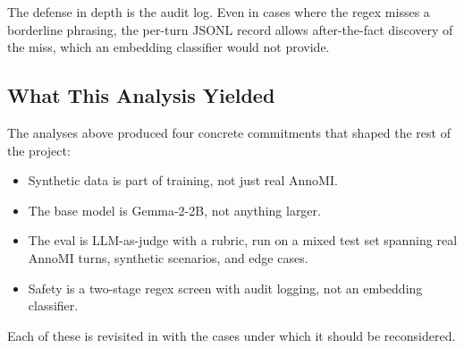 The defense in depth is the audit log. Even in cases where the regex misses
a borderline phrasing, the per-turn JSONL record allows after-the-fact
discovery of the miss, which an embedding classifier would not provide.

\subsection{What This Analysis Yielded}

The analyses above produced four concrete commitments that shaped the rest of
the project:
\begin{itemize}
    \item Synthetic data is part of training, not just real AnnoMI.
    \item The base model is Gemma-2-2B, not anything larger.
    \item The eval is LLM-as-judge with a rubric, run on a mixed test set
    spanning real AnnoMI turns, synthetic scenarios, and edge cases.
    \item Safety is a two-stage regex screen with audit logging, not an
    embedding classifier.
\end{itemize}

Each of these is revisited in  with the cases under
which it should be reconsidered.
